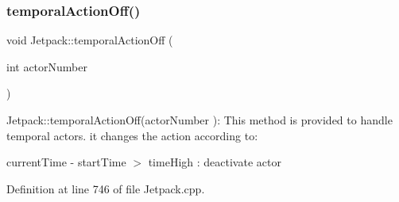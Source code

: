 \mbox{\label{class_jetpack_a2991b302cd99bf89325f9b66b104d575}} 
\subsubsection{\texorpdfstring{temporal\+Action\+Off()}{temporalActionOff()}}
{\footnotesize\ttfamily void Jetpack\+::temporal\+Action\+Off (\begin{DoxyParamCaption}\item[{int}]{actor\+Number }\end{DoxyParamCaption})}

Jetpack\+::temporal\+Action\+Off(actor\+Number )\+: This method is provided to handle temporal actors. it changes the action according to\+:

current\+Time -\/ start\+Time $>$ time\+High \+: deactivate actor 

Definition at line 746 of file Jetpack.\+cpp.


